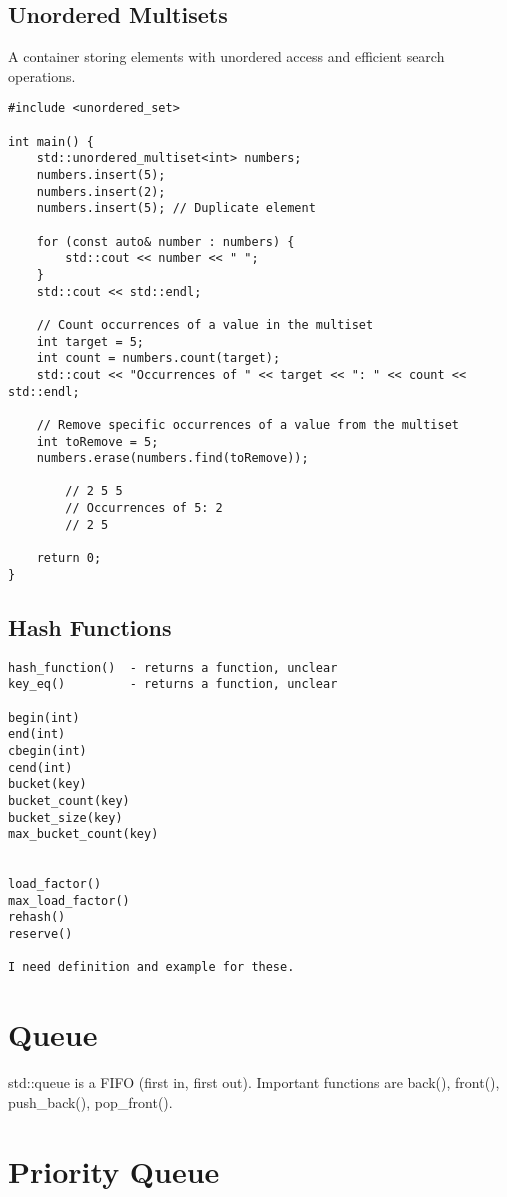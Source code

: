 \subsection{Unordered Multisets}

A container storing elements with unordered access and efficient search operations.

\begin{verbatim}
#include <unordered_set>

int main() {
    std::unordered_multiset<int> numbers;
    numbers.insert(5);
    numbers.insert(2);
    numbers.insert(5); // Duplicate element

    for (const auto& number : numbers) {
        std::cout << number << " ";
    }
    std::cout << std::endl;

    // Count occurrences of a value in the multiset
    int target = 5;
    int count = numbers.count(target);
    std::cout << "Occurrences of " << target << ": " << count << std::endl;

    // Remove specific occurrences of a value from the multiset
    int toRemove = 5;
    numbers.erase(numbers.find(toRemove));
    
        // 2 5 5
        // Occurrences of 5: 2
        // 2 5

    return 0;
}
\end{verbatim}

\subsection{Hash Functions}

\begin{verbatim}
hash_function()  - returns a function, unclear
key_eq()         - returns a function, unclear 

begin(int)
end(int)
cbegin(int)
cend(int)
bucket(key)
bucket_count(key)
bucket_size(key)
max_bucket_count(key)


load_factor()
max_load_factor()
rehash()
reserve()

I need definition and example for these.
\end{verbatim}

\section{Queue}
std::queue is a FIFO (first in, first out). Important functions are back(), front(), push\_back(), pop\_front().

\section{Priority Queue}

